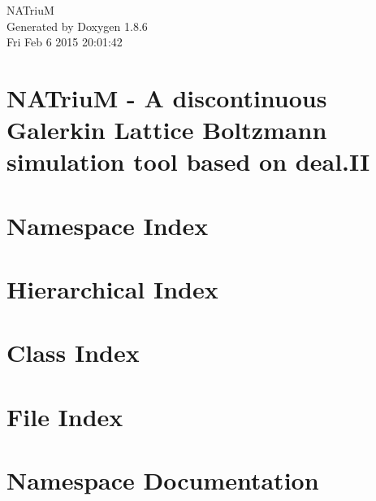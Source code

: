 \documentclass[twoside]{book}
\newcommand{\clearemptydoublepage}{%
  \newpage{\pagestyle{empty}\cleardoublepage}%
}
\begin{document}
\hypersetup{pageanchor=false}
\begin{titlepage}
\vspace*{7cm}
\begin{center}%
{\Large N\-A\-Triu\-M }\\
\vspace*{1cm}
{\large Generated by Doxygen 1.8.6}\\
\vspace*{0.5cm}
{\small Fri Feb 6 2015 20:01:42}\\
\end{center}
\end{titlepage}
\clearemptydoublepage
\tableofcontents
\clearemptydoublepage
{}
\hypersetup{pageanchor=true}

\chapter{N\-A\-Triu\-M -\/ A discontinuous Galerkin Lattice Boltzmann simulation tool based on deal.\-I\-I}
\label{index}\hypertarget{index}{}
\chapter{Namespace Index}

\chapter{Hierarchical Index}

\chapter{Class Index}

\chapter{File Index}

\chapter{Namespace Documentation}

\end{document}
